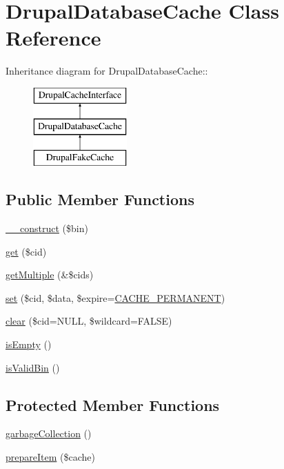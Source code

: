 \hypertarget{classDrupalDatabaseCache}{
\section{DrupalDatabaseCache Class Reference}
\label{classDrupalDatabaseCache}
}
Inheritance diagram for DrupalDatabaseCache::\begin{figure}[H]
\begin{center}
\leavevmode
\includegraphics[height=3cm]{classDrupalDatabaseCache}
\end{center}
\end{figure}
\subsection*{Public Member Functions}
\begin{DoxyCompactItemize}
\item 
\hyperlink{classDrupalDatabaseCache_aacdbd5ca89efaaa78ab8d66fca003cc4}{\_\-\_\-construct} (\$bin)
\item 
\hyperlink{classDrupalDatabaseCache_a66a573f6f3e13198b1e95fdc4bd14f8e}{get} (\$cid)
\item 
\hyperlink{classDrupalDatabaseCache_ad9f421906b15c039f1842cf8c14e8768}{getMultiple} (\&\$cids)
\item 
\hyperlink{classDrupalDatabaseCache_a8262bd7a36ca026f6b8c31c30c0f722d}{set} (\$cid, \$data, \$expire=\hyperlink{bootstrap_8inc_ad987330fff5fa7c75800762ddedf300c}{CACHE\_\-PERMANENT})
\item 
\hyperlink{classDrupalDatabaseCache_a07b7a236787af4e11615f26dd98f51f7}{clear} (\$cid=NULL, \$wildcard=FALSE)
\item 
\hyperlink{classDrupalDatabaseCache_addc129b38e3ffdda5a55f2f453ea5619}{isEmpty} ()
\item 
\hyperlink{classDrupalDatabaseCache_a3d9f8274f05d6c23515a15bad5e997a4}{isValidBin} ()
\end{DoxyCompactItemize}
\subsection*{Protected Member Functions}
\begin{DoxyCompactItemize}
\item 
\hyperlink{classDrupalDatabaseCache_ab29683fb16e22bae9029912548ffa67b}{garbageCollection} ()
\item 
\hyperlink{classDrupalDatabaseCache_a63148b862b8b39426c50f45e1c7fe43d}{prepareItem} (\$cache)
\end{DoxyCompactItemize}
